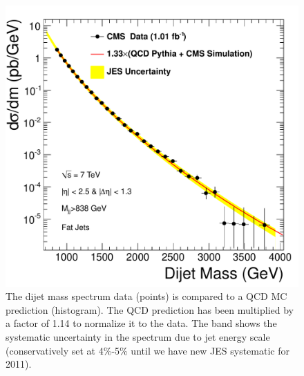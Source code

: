 \begin{figure}[!ht]
  \begin{center}
   \includegraphics[width=\textwidth]{Figures/dijet_mass_Xsec.pdf}
    \caption{ The dijet mass spectrum data (points) is compared to a QCD MC prediction (histogram).
    The QCD prediction has been multiplied by a factor of 1.14 to normalize it to the data.
    The band shows the systematic uncertainty in the spectrum due to jet energy scale
    (conservatively set at 4\%-5\% until we have new JES systematic for 2011).}
    \label{Spectrum}
  \end{center}
\end{figure}

